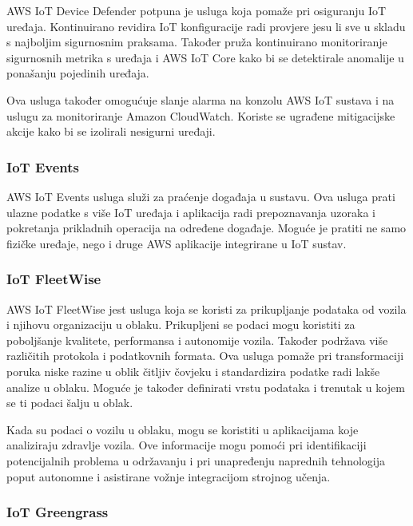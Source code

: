 AWS IoT Device Defender potpuna je usluga koja pomaže pri osiguranju IoT uređaja. Kontinuirano revidira IoT konfiguracije radi provjere jesu li sve u skladu s najboljim sigurnosnim praksama. Također pruža kontinuirano monitoriranje sigurnosnih metrika s uređaja i AWS IoT Core kako bi se detektirale anomalije u ponašanju pojedinih uređaja. 

Ova usluga također omogućuje slanje alarma na konzolu AWS IoT sustava i na uslugu za monitoriranje Amazon CloudWatch. Koriste se ugrađene mitigacijske akcije kako bi se izolirali nesigurni uređaji.

\subsubsection{IoT Events}

AWS IoT Events usluga služi za praćenje događaja u sustavu. Ova usluga prati ulazne podatke s više IoT uređaja i aplikacija radi prepoznavanja uzoraka i pokretanja prikladnih operacija na određene događaje. Moguće je pratiti ne samo fizičke uređaje, nego i druge AWS aplikacije integrirane u IoT sustav.

\subsubsection{IoT FleetWise}

AWS IoT FleetWise jest usluga koja se koristi za prikupljanje podataka od vozila i njihovu organizaciju u oblaku. Prikupljeni se podaci mogu koristiti za poboljšanje kvalitete, performansa i autonomije vozila. Također podržava više različitih protokola i podatkovnih formata. Ova usluga pomaže pri transformaciji poruka niske razine  u oblik čitljiv čovjeku i standardizira podatke radi lakše analize u oblaku. Moguće je također definirati vrstu podataka i trenutak u kojem se ti podaci šalju u oblak.

Kada su podaci o vozilu u oblaku, mogu se koristiti u aplikacijama koje analiziraju zdravlje vozila. Ove informacije mogu pomoći pri identifikaciji potencijalnih problema u održavanju i pri unapređenju naprednih tehnologija poput autonomne i asistirane vožnje integracijom strojnog učenja.

\subsubsection{IoT Greengrass}


